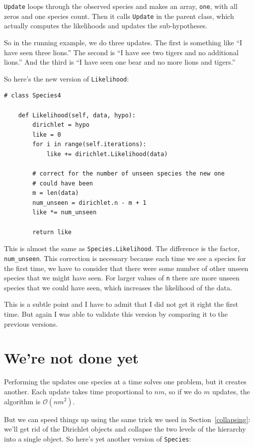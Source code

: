 \documentclass[12pt]{book}
\begin{document}
{\tt Update} loops through the observed species and makes an
array, {\tt one}, with all zeros and one species count.  Then
it calls {\tt Update} in the parent class, which actually computes
the likelihoods and updates the sub-hypotheses.

So in the running example, we do three updates.  The first
is something like ``I have seen three lions.''  The second is
``I have see two tigers and no additional lions.''  And the third
is ``I have seen one bear and no more lions and tigers.''

So here's the new version of {\tt Likelihood}:

\begin{verbatim}
# class Species4

    def Likelihood(self, data, hypo):
        dirichlet = hypo
        like = 0
        for i in range(self.iterations):
            like += dirichlet.Likelihood(data)

        # correct for the number of unseen species the new one
        # could have been
        m = len(data)
        num_unseen = dirichlet.n - m + 1
        like *= num_unseen

        return like
\end{verbatim}

This is almost the same as {\tt Species.Likelihood}.  The difference
is the factor, \verb"num_unseen".  This correction is necessary
because each time we see a species for the first time, we have to
consider that there were some number of other unseen species that
we might have seen.  For larger values of {\tt n} there are more
unseen species that we could have seen, which increases the likelihood
of the data.

This is a subtle point and I have to admit that I did not get it right
the first time.  But again I was able to validate this version
by comparing it to the previous versions.


\section{We're not done yet}

\newcommand{\BigO}[1]{\mathcal{O}(#1)}

Performing the updates one species at a time solves one problem, but
it creates another.  Each update takes time proportional to $n m$,
so if we do $m$ updates, the algorithm is $\BigO{n m^2}$. 

But we can speed things up using the same trick we used in
Section~\ref{collapsing}: we'll get rid of the Dirichlet objects and
collapse the two levels of the hierarchy into a single object.  So
here's yet another version of {\tt Species}:
\end{document}
